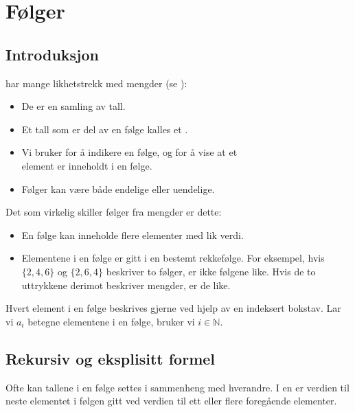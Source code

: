 




\section{Følger}
\subsection*{Introduksjon}
 har mange likhetstrekk med mengder (se \tmen):
\begin{itemize}
	\item De er en samling av tall.
	\item Et tall som er del av en følge kalles et .
	\item Vi bruker \sym{$ \lbrace\rbrace $} for å indikere en følge, og \sym{$ \in $} for å vise at et\\ element er inneholdt i en følge.
	\item Følger kan være både endelige eller uendelige.
\end{itemize}
Det som virkelig skiller følger fra mengder er dette:
\begin{itemize}
	\item  En følge kan inneholde flere elementer med lik verdi.
	\item Elementene i en følge er gitt i en bestemt rekkefølge. For eksempel, hvis $\lbrace{2, 4, 6\rbrace}$ og ${\lbrace2, 6, 4\rbrace}$ beskriver to følger, er ikke følgene like. Hvis de to uttrykkene derimot beskriver mengder, er de like.
\end{itemize}
Hvert element i en følge beskrives gjerne ved hjelp av en indeksert bokstav. Lar vi $ a_i $ betegne elementene i en følge, bruker vi $ {i\in \mathbb{N}}$.




\subsection*{Rekursiv og eksplisitt formel}
Ofte kan tallene i en følge settes i sammenheng med hverandre. I en  er verdien til neste elementet i følgen gitt ved verdien til ett eller flere foregående elementer.
 \vsk

